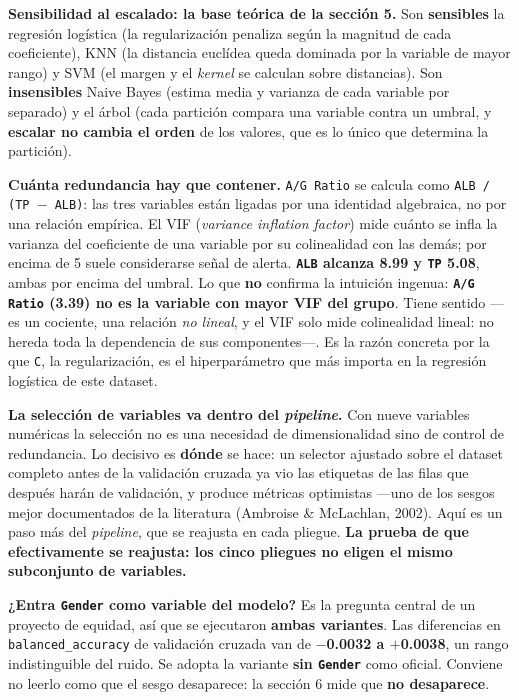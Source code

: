\documentclass[10pt,a4paper]{article}
\begin{document}
\textbf{Sensibilidad al escalado: la base teórica de la sección 5.} Son \textbf{sensibles} la regresión logística (la regularización penaliza según la magnitud de cada coeficiente), KNN (la distancia euclídea queda dominada por la variable de mayor rango) y SVM (el margen y el \textit{kernel} se calculan sobre distancias). Son \textbf{insensibles} Naive Bayes (estima media y varianza de cada variable por separado) y el árbol (cada partición compara una variable contra un umbral, y \textbf{escalar no cambia el orden} de los valores, que es lo único que determina la partición).

\textbf{Cuánta redundancia hay que contener.} \texttt{A/G Ratio} se calcula como \texttt{ALB / (TP $-$ ALB)}: las tres variables están ligadas por una identidad algebraica, no por una relación empírica. El VIF (\textit{variance inflation factor}) mide cuánto se infla la varianza del coeficiente de una variable por su colinealidad con las demás; por encima de 5 suele considerarse señal de alerta. \textbf{\texttt{ALB} alcanza 8.99 y \texttt{TP} 5.08}, ambas por encima del umbral. Lo que \textbf{no} confirma la intuición ingenua: \textbf{\texttt{A/G Ratio} (3.39) no es la variable con mayor VIF del grupo}. Tiene sentido ---es un cociente, una relación \textit{no lineal}, y el VIF solo mide colinealidad lineal: no hereda toda la dependencia de sus componentes---. Es la razón concreta por la que \texttt{C}, la regularización, es el hiperparámetro que más importa en la regresión logística de este dataset.

\textbf{La selección de variables va dentro del \textit{pipeline}.} Con nueve variables numéricas la selección no es una necesidad de dimensionalidad sino de control de redundancia. Lo decisivo es \textbf{dónde} se hace: un selector ajustado sobre el dataset completo antes de la validación cruzada ya vio las etiquetas de las filas que después harán de validación, y produce métricas optimistas ---uno de los sesgos mejor documentados de la literatura (Ambroise \& McLachlan, 2002). Aquí es un paso más del \textit{pipeline}, que se reajusta en cada pliegue. \textbf{La prueba de que efectivamente se reajusta: los cinco pliegues no eligen el mismo subconjunto de variables.}

\textbf{¿Entra \texttt{Gender} como variable del modelo?} Es la pregunta central de un proyecto de equidad, así que se ejecutaron \textbf{ambas variantes}. Las diferencias en \texttt{balanced\_accuracy} de validación cruzada van de \textbf{$-$0.0032 a $+$0.0038}, un rango indistinguible del ruido. Se adopta la variante \textbf{sin \texttt{Gender}} como oficial. Conviene no leerlo como que el sesgo desaparece: la sección 6 mide que \textbf{no desaparece}.
\end{document}
